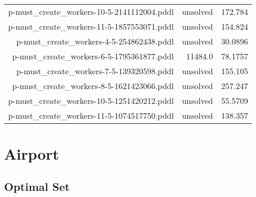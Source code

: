 \documentclass{article}
\begin{document}
\begin{center}
\begin{tabular}{r|r|r}
 p-must\_create\_workers-10-5-2141112004.pddl&unsolved&172.784\\
 p-must\_create\_workers-11-5-1857553071.pddl&unsolved&154.824\\
 p-must\_create\_workers-4-5-254862438.pddl&unsolved&30.0896\\
 p-must\_create\_workers-6-5-1795361877.pddl&11484.0&78.1757\\
 p-must\_create\_workers-7-5-139320598.pddl&unsolved&155.105\\
 p-must\_create\_workers-8-5-1621423066.pddl&unsolved&257.247\\
 p-must\_create\_workers-10-5-1251420212.pddl&unsolved&55.5709\\
 p-must\_create\_workers-11-5-1074517750.pddl&unsolved&138.357
                            \end{tabular}
                            \end{center}
                    
                \newpage \section{Airport}
                    \subsection*{Optimal Set}
                    
\end{document}
